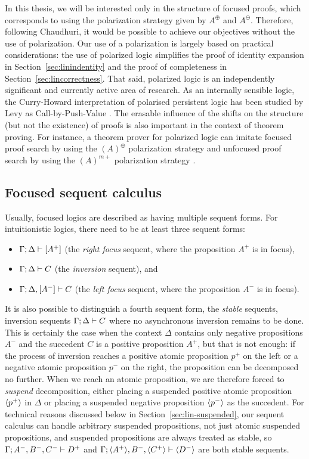 In this thesis, we will be interested only in the structure of focused
proofs, which corresponds to using the polarization strategy given by
$A^\oplus$ and $A^\ominus$. Therefore, following Chaudhuri, it would
be possible to achieve our objectives without the use of polarization.
Our use of a polarization is largely based on practical
considerations: the use of polarized logic simplifies the proof of
identity expansion in Section~\ref{sec:linindentity} and the proof of
completeness in Section~\ref{sec:lincorrectness}. That said, polarized
logic is an independently significant and currently active area of
research. As an internally sensible logic, the Curry-Howard
interpretation of polarised persistent logic has been studied by Levy
as Call-by-Push-Value \cite{levy04call}. The erasable influence of the
shifts on the structure (but not the existence) of proofs is also
important in the context of theorem proving. For instance, a theorem
prover for polarized logic can imitate focused proof search by using
the $(A)^\oplus$ polarization strategy and unfocused proof search by
using the $(A)^{m+}$ polarization strategy
\cite{mclaughlin09efficient}.

\subsection{Focused sequent calculus}
\label{sec:linfocseqcalcdef}

Usually, focused logics are described as having multiple sequent
forms. For intuitionistic logics, there need to be at least three
sequent forms:
\smallskip
\begin{itemize}
\item ${\Gamma};{\Delta} \vdash [{A^+}] \mathstrut$ (the {\it right focus} sequent, where
the proposition $A^+$ is in focus),
\item ${\Gamma};{\Delta} \vdash {C} \mathstrut$ (the {\it inversion} sequent), and
\item ${\Gamma};{\Delta}, [{A^-}] \vdash {C} \mathstrut$ (the {\it left focus} sequent,
where the proposition $A^-$ is in focus).
\end{itemize}
\smallskip
It is also possible to distinguish a fourth sequent form, the {\it
  stable} sequents, inversion sequents ${\Gamma};{\Delta} \vdash {C} \mathstrut$
where no asynchronous inversion remains to be done. This is certainly
the case when the context $\Delta$ contains only negative propositions
$A^-$ and the succedent $C$ is a positive proposition $A^+$, but that
is not enough: if the process of inversion reaches a positive atomic
proposition $p^+$ on the left or a negative atomic proposition $p^-$
on the right, the proposition can be decomposed no further. When we
reach an atomic proposition, we are therefore forced to {\it suspend}
decomposition, either placing a suspended positive atomic proposition
$\langle {p^+} \rangle$ in $\Delta$ or placing a suspended negative proposition
$\langle {p^-} \rangle$ as the succedent. For technical reasons discussed below
in Section~\ref{sec:lin-suspended}, our sequent calculus can handle
arbitrary suspended propositions, not just atomic suspended
propositions, and suspended propositions are always treated as stable,
so ${\Gamma};{A^-, B^-, C^-} \vdash {D^+} \mathstrut$ and
${\Gamma};{\langle {A^+} \rangle, B^-, \langle {C^+} \rangle} \vdash {\langle {D^-} \rangle} \mathstrut$ are both
stable sequents.


